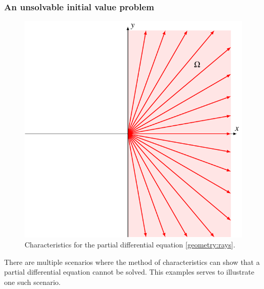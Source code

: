 \subsubsection{An unsolvable initial value problem\label{unloesbar}}
\begin{figure}
\centering
\includegraphics{3-geometry/images/rays.pdf}
\caption{Characteristics for the partial differential equation
\eqref{geometry:rays}.
\label{geometry:rays:image}
}
\end{figure}
There are multiple scenarios where the method of characteristics can 
show that a partial differential equation cannot be solved.
This examples serves to illustrate one such scenario.

